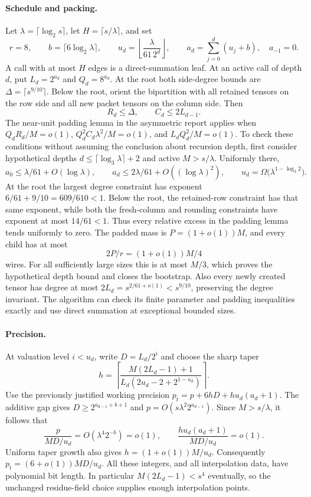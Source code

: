 \paragraph{Schedule and packing.}
Let $\lambda=\lceil\log_2s\rceil$, let $H=\lceil s/\lambda\rceil$,
and set
\[
 r=8,\qquad b=\lceil6\log_2\lambda\rceil,\qquad
 u_d=\left\lfloor\frac{\lambda}{61\,2^d}\right\rfloor,\qquad
 a_d=\sum_{j=0}^{d}(u_j+b),\quad a_{-1}=0.
\]
A call with at most $H$ edges is a direct-summation leaf.  At an active
call of depth $d$, put $L_d=2^{a_d}$ and $Q_d=8^{a_d}$.  At the root both
side-degree bounds are $\Delta=\lceil s^{9/10}\rceil$.  Below the root,
orient the bipartition with all retained tensors on the row side and all
new packet tensors on the column side.  Then
\[
 R_d\le\Delta,\qquad C_d\le2L_{d-1}.
\]
The near-unit padding lemma in the asymmetric report applies when
$Q_dR_d/M=o(1)$, $Q_d^2C_d\lambda^2/M=o(1)$, and
$L_dQ_d^2/M=o(1)$.  To check these conditions without assuming the
conclusion about recursion depth, first consider hypothetical depths
$d\le\lceil\log_3\lambda\rceil+2$ and active $M>s/\lambda$.
Uniformly there,
\[
 a_0\le\lambda/61+O(\log\lambda),\qquad
 a_d\le2\lambda/61+O((\log\lambda)^2),\qquad
 u_d=\Omega\bigl(\lambda^{1-\log_3 2}\bigr).
\]
At the root the largest degree constraint has exponent
$6/61+9/10=609/610<1$.  Below the root, the retained-row constraint
has that same exponent, while both the fresh-column and rounding
constraints have exponent at most $14/61<1$.  Thus every relative
excess in the padding lemma tends uniformly to zero.  The padded mass is
$P=(1+o(1))M$, and every child has at most
\[
 2P/r=(1+o(1))M/4
\]
wires.  For all sufficiently large sizes this is at most $M/3$,
which proves the hypothetical depth bound and closes the bootstrap.
Also every newly created tensor has degree at most
$2L_d=s^{2/61+o(1)}<s^{9/10}$, preserving the degree invariant.
The algorithm can check its finite parameter and padding inequalities
exactly and use direct summation at exceptional bounded sizes.

\paragraph{Precision.}
At valuation level $i<u_d$, write $D=L_d/2^i$ and choose the sharp taper
\[
 h=\left\lceil\frac{M(2L_d-1)+1}
                  {L_d(2u_d-2+2^{1-u_d})}\right\rceil.
\]
Use the previously justified working precision
$p_t=p+6hD+hu_d(a_d+1)$.  The additive gap gives
$D\ge2^{a_{d-1}+b+1}$ and $p=O(s\lambda^2 2^{a_{d-1}})$.
Since $M>s/\lambda$, it follows that
\[
 \frac{p}{MD/u_d}=O(\lambda^4 2^{-b})=o(1),\qquad
 \frac{hu_d(a_d+1)}{MD/u_d}=o(1).
\]
Uniform taper growth also gives $h=(1+o(1))M/u_d$.  Consequently
$p_t=(6+o(1))MD/u_d$.  All these integers, and all interpolation data,
have polynomial bit length.  In particular $M(2L_d-1)<s^4$ eventually,
so the unchanged residue-field choice supplies enough interpolation points.

